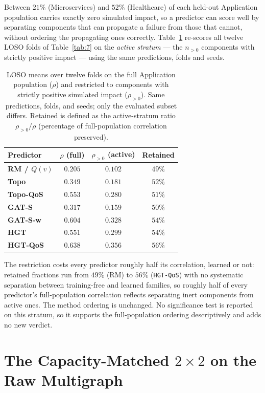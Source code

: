 \documentclass[preprint,3p]{elsarticle}
\begin{document}
Between $21\%$ (Microservices) and $52\%$ (Healthcare) of each held-out Application population carries exactly zero simulated impact, so a predictor can score well by separating components that can propagate a failure from those that cannot, without ordering the propagating ones correctly. Table~\ref{tab:7c} re-scores all twelve LOSO folds of Table~\ref{tab:7} on the \emph{active stratum} --- the $n_{>0}$ components with strictly positive impact --- using the same predictions, folds and seeds.

\begin{table}[htbp]
\centering
\small
\caption{LOSO means over twelve folds on the full Application population ($\rho$) and restricted to components with strictly positive simulated impact ($\rho_{>0}$). Same predictions, folds, and seeds; only the evaluated subset differs. Retained is defined as the active-stratum ratio $\rho_{>0}/\rho$ (percentage of full-population correlation preserved).}
\label{tab:7c}
\begin{tabular}{lccc}
\toprule
\textbf{Predictor} & \textbf{$\rho$ (full)} & \textbf{$\rho_{>0}$ (active)} & \textbf{Retained} \\
\midrule
\textbf{RM / $Q(v)$} & $0.205$ & $0.102$ & $49\%$ \\
\textbf{Topo} & $0.349$ & $0.181$ & $52\%$ \\
\textbf{Topo-QoS} & $0.553$ & $0.280$ & $51\%$ \\
\textbf{GAT-S} & $0.317$ & $0.159$ & $50\%$ \\
\textbf{GAT-S-w} & $0.604$ & $0.328$ & $54\%$ \\
\textbf{HGT} & $0.551$ & $0.299$ & $54\%$ \\
\textbf{HGT-QoS} & $\mathbf{0.638}$ & $\mathbf{0.356}$ & $56\%$ \\
\bottomrule
\end{tabular}
\end{table}

\noindent The restriction costs every predictor roughly half its correlation, learned or not: retained fractions run from $49\%$ (RM) to $56\%$ (\texttt{HGT-QoS}) with no systematic separation between training-free and learned families, so roughly half of every predictor's full-population correlation reflects separating inert components from active ones. The method ordering is unchanged. No significance test is reported on this stratum, so it supports the full-population ordering descriptively and adds no new verdict.

\section{The Capacity-Matched \texorpdfstring{$2\times2$}{2x2} on the Raw Multigraph}
\label{supp:matched-2x2}
\end{document}
